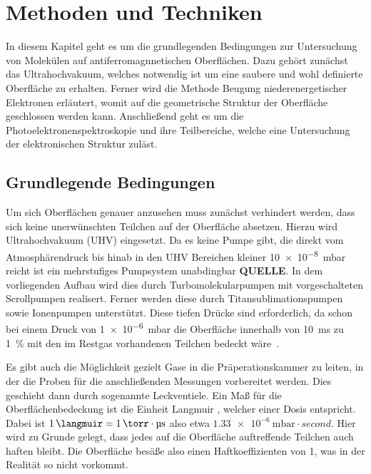 \chapter{Methoden und Techniken} \label{cha:Methoden}
    In diesem Kapitel geht es um die grundlegenden Bedingungen zur Untersuchung von Molekülen auf antiferromagnnetischen Oberflächen.
    Dazu gehört zunächst das Ultrahochvakuum, welches notwendig ist um eine saubere und wohl definierte Oberfläche zu erhalten.
    Ferner wird die Methode Beugung niederenergetischer Elektronen erläutert, womit auf die geometrische Struktur der Oberfläche geschlossen werden kann.
    Anschließend geht es um die Photoelektronenspektroskopie und ihre Teilbereiche, welche eine Untersuchung der elektronischen Struktur zuläst.

    \section{Grundlegende Bedingungen} \label{sec:Grundlagen}
        Um sich Oberflächen genauer anzusehen muss zunächst verhindert werden, dass sich keine unerwünschten Teilchen auf der Oberfläche absetzen.
        Hierzu wird Ultrahochvakuum (UHV) eingesetzt.
        Da es keine Pumpe gibt, die direkt vom Atmosphärendruck bis hinab in den UHV Bereichen kleiner \SI{10e-8}{\milli\bar} reicht ist ein mehrstufiges Pumpsystem unabdingbar \textbf{QUELLE}.
        In dem vorliegenden Aufbau wird dies durch Turbomolekularpumpen mit vorgeschalteten Scrollpumpen realisert.
        Ferner werden diese durch Titansublimationspumpen sowie Ionenpumpen unterstützt.
        Diese tiefen Drücke sind erforderlich, da schon bei einem Druck von \SI{1e-6}{\milli\bar} die Oberfläche innerhalb von \SI{10}{\milli\second} zu \SI{1}{\percent} mit den im Restgas vorhandenen Teilchen bedeckt wäre~\cite{henzler}.

        Es gibt auch die Möglichkeit gezielt Gase in die Präperationskammer zu leiten, in der die Proben für die anschließenden Messungen vorbereitet werden.
        Dies geschieht dann durch sogenannte Leckventiele.
        Ein Maß für die Oberflächenbedeckung ist die Einheit Langmuir \si{\langmuir}, welcher einer Dosis entspricht.
        Dabei ist $\SI{1}{\langmuir} = \SI{1}{\torr} \cdot \si{\micro\second}$ also etwa $\SI{1.33e-6}{\milli\bar} \cdot \si{second}$.
        Hier wird zu Grunde gelegt, dass jedes auf die Oberfläche auftreffende Teilchen auch haften bleibt. 
        Die Oberfläche besäße also einen Haftkoeffizienten von \num{1}, was in der Realität so nicht vorkommt.

